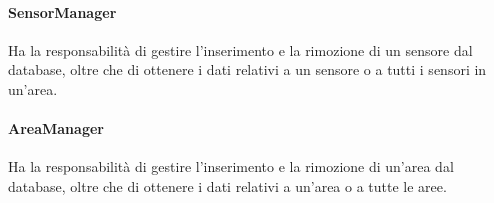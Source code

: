 \paragraph{SensorManager}

Ha la responsabilità di gestire l'inserimento e la rimozione di un sensore dal database, oltre che di ottenere i dati relativi a un sensore o a tutti i sensori in un'area.

\paragraph{AreaManager}
Ha la responsabilità di gestire l'inserimento e la rimozione di un'area dal database, oltre che di ottenere i dati relativi a un'area o a tutte le aree.
